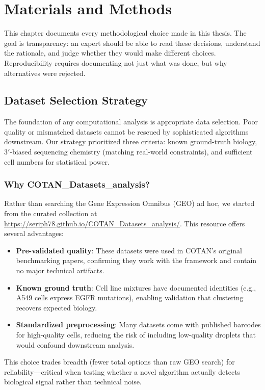 \chapter{Materials and Methods}

This chapter documents every methodological choice made in this thesis. The goal is transparency: an expert should be able to read these decisions, understand the rationale, and judge whether they would make different choices. Reproducibility requires documenting not just what was done, but why alternatives were rejected.

\section{Dataset Selection Strategy}

The foundation of any computational analysis is appropriate data selection. Poor quality or mismatched datasets cannot be rescued by sophisticated algorithms downstream. Our strategy prioritized three criteria: known ground-truth biology, $3'$-biased sequencing chemistry (matching real-world constraints), and sufficient cell numbers for statistical power.

\subsection*{Why COTAN\_Datasets\_analysis?}

Rather than searching the Gene Expression Omnibus (GEO) ad hoc, we started from the curated collection at \url{https://seriph78.github.io/COTAN_Datasets_analysis/}. This resource offers several advantages:

\begin{itemize}
    \item \textbf{Pre-validated quality}: These datasets were used in COTAN's original benchmarking papers, confirming they work with the framework and contain no major technical artifacts.
    \item \textbf{Known ground truth}: Cell line mixtures have documented identities (e.g., A549 cells express EGFR mutations), enabling validation that clustering recovers expected biology.
    \item \textbf{Standardized preprocessing}: Many datasets come with published barcodes for high-quality cells, reducing the risk of including low-quality droplets that would confound downstream analysis.
\end{itemize}

This choice trades breadth (fewer total options than raw GEO search) for reliability---critical when testing whether a novel algorithm actually detects biological signal rather than technical noise.

